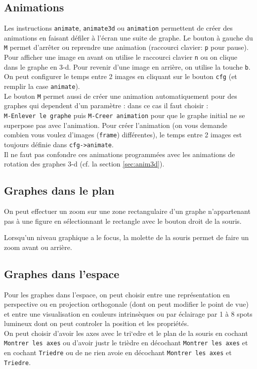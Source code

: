\documentclass[a4paper,11pt]{article}
\begin{document}
\subsection{Animations}
Les instructions \verb|animate|, \verb|animate3d|
ou \verb|animation| permettent de cr\'eer des animations en
faisant d\'efiler \`a l'\'ecran une suite de graphe. Le bouton
\`a gauche du \verb|M| permet d'arr\^eter ou reprendre une animation
(raccourci clavier: {\tt p} pour pause). Pour afficher une image en avant
on utilise le raccourci clavier {\tt n} ou on clique dans le graphe en 3-d. 
Pour revenir d'une image en arri\`ere, on utilise
la touche {\tt b}. On peut configurer le temps entre 2 images en cliquant
sur le bouton \verb|cfg| (et remplir la case \verb|animate|).\\
Le bouton \verb|M| permet aussi de cr\'eer une animation automatiquement pour
des graphes qui dependent d'un param\`etre : dans ce cas il faut choisir :\\ 
\verb|M-Enlever le graphe| puis \verb|M-Creer animation| pour que le graphe
initial ne se superpose pas avec l'animation. Pour cr\'eer l'animation (on vous
 demande combien vous voulez d'images ({\tt frame}) diff\'erentes), le temps 
entre 2 images est toujours d\'efinie dans {\tt cfg->animate}.\\
Il ne faut pas confondre ces animations programm\'ees avec les
animations de rotation des graphes 3-d (cf. la section \ref{sec:anim3d}).

\subsection{Graphes dans le plan}
On peut effectuer un zoom sur une zone rectangulaire d'un graphe
n'appartenant pas \`a une figure en s\'electionnant le rectangle
avec le bouton droit de la souris.

Lorsqu'un niveau graphique a le focus, la molette de la souris permet 
de faire un zoom avant ou arri\`ere.

\subsection{Graphes dans l'espace}
Pour les graphes dans l'espace, on peut choisir entre une
repr\'esentation en perspective ou en projection orthogonale (dont on 
peut modifier le point de vue) et entre
une visualisation en couleurs intrins\`eques ou par \'eclairage
par 1 \`a 8 spots lumineux dont on peut controler la position et
les propri\'et\'es.\\
On peut choisir d'avoir les axes avec le tri`edre et le plan de la souris en 
cochant {\tt Montrer les axes} ou d'avoir justr le tri\`edre en d\'ecochant 
{\tt Montrer les axes} et en cochant {\tt Triedre} ou de ne rien avoie en 
d\'ecochant {\tt Montrer les axes} et {\tt Triedre}.
\end{document}
